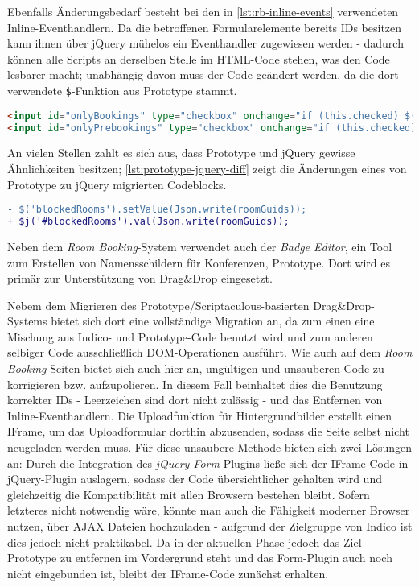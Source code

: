 Ebenfalls Änderungsbedarf besteht bei den in \autoref{lst:rb-inline-events} verwendeten
Inline-Eventhandlern. Da die betroffenen Formularelemente bereits IDs besitzen kann ihnen über
jQuery mühelos ein Eventhandler zugewiesen werden - dadurch können alle Scripts an derselben Stelle
im HTML-Code stehen, was den Code lesbarer macht; unabhängig davon muss der Code geändert werden, da
die dort verwendete \lstinline{$}-Funktion aus Prototype stammt.

\begin{lstlisting}[language=HTML,caption=Inline-Eventhandler]
<input id="onlyBookings" type="checkbox" onchange="if (this.checked) $('onlyPrebookings').checked = false;"/>
<input id="onlyPrebookings" type="checkbox" onchange="if (this.checked) $('onlyBookings').checked = false;" />
\end{lstlisting}

An vielen Stellen zahlt es sich aus, dass Prototype und jQuery gewisse Ähnlichkeiten besitzen;
\autoref{lst:prototype-jquery-diff} zeigt die Änderungen eines von Prototype zu jQuery migrierten
Codeblocks.

\begin{lstlisting}[language=diff,label=lst:prototype-jquery-diff,caption=Ähnlichkeit zwischen jQuery und Prototype]
- $('blockedRooms').setValue(Json.write(roomGuids));
+ $j('#blockedRooms').val(Json.write(roomGuids));
\end{lstlisting}

Neben dem \emph{Room Booking}-System verwendet auch der \emph{Badge Editor}, ein Tool zum Erstellen
von Namensschildern für Konferenzen, Prototype. Dort wird es primär zur Unterstützung von Drag\&Drop
eingesetzt.


Nebem dem Migrieren des Prototype/Scriptaculous-basierten Drag\&Drop-Systems bietet sich dort eine
vollständige Migration an, da zum einen eine Mischung aus Indico- und Prototype-Code benutzt wird
und zum anderen selbiger Code ausschließlich DOM-Operationen ausführt. Wie auch auf dem \emph{Room
Booking}-Seiten bietet sich auch hier an, ungültigen und unsauberen Code zu korrigieren bzw.
aufzupolieren. In diesem Fall beinhaltet dies die Benutzung korrekter IDs - Leerzeichen sind dort
nicht zulässig - und das Entfernen von Inline-Eventhandlern. Die Uploadfunktion für
Hintergrundbilder erstellt einen IFrame, um das Uploadformular dorthin abzusenden, sodass die Seite
selbst nicht neugeladen werden muss. Für diese unsaubere Methode bieten sich zwei Lösungen an: Durch
die Integration des \emph{jQuery Form}-Plugins ließe sich der IFrame-Code in jQuery-Plugin
auslagern, sodass der Code übersichtlicher gehalten wird und gleichzeitig die Kompatibilität mit
allen Browsern bestehen bleibt. Sofern letzteres nicht notwendig wäre, könnte man auch die Fähigkeit
moderner Browser nutzen, über AJAX Dateien hochzuladen - aufgrund der Zielgruppe von Indico ist dies
jedoch nicht praktikabel. Da in der aktuellen Phase jedoch das Ziel Prototype zu entfernen im
Vordergrund steht und das Form-Plugin auch noch nicht eingebunden ist, bleibt der IFrame-Code
zunächst erhalten.
